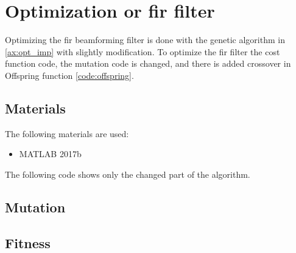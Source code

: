 \chapter{Optimization or \gls{fir} filter}\label{ax:opt_imp_filter}
Optimizing the \gls{fir} beamforming filter is done with the genetic algorithm in \autoref{ax:opt_imp} with slightly modification. To optimize the \gls{fir} filter the cost function code, the mutation code is changed, and there is added crossover in Offspring function \autoref{code:offspring}.


\section*{Materials}
The following materials are used:
\begin{itemize}
\item MATLAB 2017b
\end{itemize}

The following code shows only the changed part of the algorithm.


\section{Mutation}

\section{Fitness}
